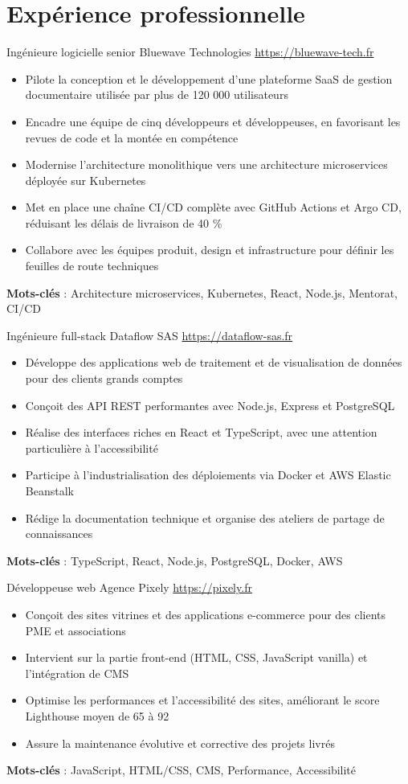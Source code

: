 \documentclass[a4paper, serif, 10pt]{moderncv}
\begin{document}
\section{Expérience professionnelle}

        {Ingénieure logicielle senior}
        {Bluewave Technologies}
        {\url{https://bluewave-tech.fr}}
        {}
        {\begin{itemize}
\item Pilote la conception et le développement d’une plateforme SaaS de gestion documentaire utilisée par plus de 120 000 utilisateurs
\item Encadre une équipe de cinq développeurs et développeuses, en favorisant les revues de code et la montée en compétence
\item Modernise l’architecture monolithique vers une architecture microservices déployée sur Kubernetes
\item Met en place une chaîne CI/CD complète avec GitHub Actions et Argo CD, réduisant les délais de livraison de 40 \%
\item Collabore avec les équipes produit, design et infrastructure pour définir les feuilles de route techniques
\end{itemize}
\textbf{Mots-clés} : Architecture microservices, Kubernetes, React, Node.js, Mentorat, CI/CD}

        {Ingénieure full-stack}
        {Dataflow SAS}
        {\url{https://dataflow-sas.fr}}
        {}
        {\begin{itemize}
\item Développe des applications web de traitement et de visualisation de données pour des clients grands comptes
\item Conçoit des API REST performantes avec Node.js, Express et PostgreSQL
\item Réalise des interfaces riches en React et TypeScript, avec une attention particulière à l’accessibilité
\item Participe à l’industrialisation des déploiements via Docker et AWS Elastic Beanstalk
\item Rédige la documentation technique et organise des ateliers de partage de connaissances
\end{itemize}
\textbf{Mots-clés} : TypeScript, React, Node.js, PostgreSQL, Docker, AWS}

        {Développeuse web}
        {Agence Pixely}
        {\url{https://pixely.fr}}
        {}
        {\begin{itemize}
\item Conçoit des sites vitrines et des applications e-commerce pour des clients PME et associations
\item Intervient sur la partie front-end (HTML, CSS, JavaScript vanilla) et l’intégration de CMS
\item Optimise les performances et l’accessibilité des sites, améliorant le score Lighthouse moyen de 65 à 92
\item Assure la maintenance évolutive et corrective des projets livrés
\end{itemize}
\textbf{Mots-clés} : JavaScript, HTML/CSS, CMS, Performance, Accessibilité}
\end{document}
